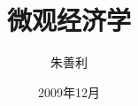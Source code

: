 \documentclass[a4paper,10pt,titlepage]{book}
\renewcommand{\chaptername}{第\thechapter{}章}
\begin{document}


\title{\Huge 微观经济学}
\author{朱善利}
\date{2009年12月}
\maketitle




%
\tableofcontents

\renewcommand{\chaptermark}[1]{\markboth{\chaptername\ #1}{}}
\renewcommand{\sectionmark}[1]{\markright{\thesection\ #1}}

%
%
%
%
%
%
%
%


%
%

%



\end{document}

